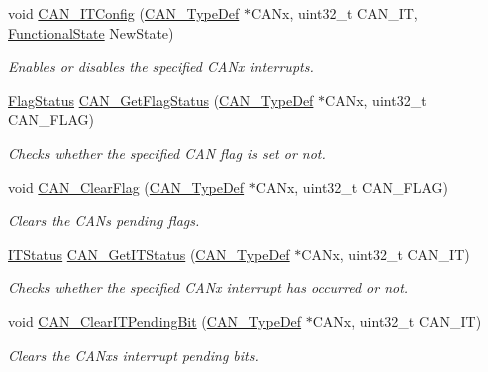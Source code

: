 \begin{DoxyCompactItemize}
void \mbox{\hyperlink{group___c_a_n___private___functions_gad1a8b2499a780b5bfa4accb3597b02f4}{C\+A\+N\+\_\+\+I\+T\+Config}} (\mbox{\hyperlink{struct_c_a_n___type_def}{C\+A\+N\+\_\+\+Type\+Def}} $\ast$C\+A\+Nx, uint32\+\_\+t C\+A\+N\+\_\+\+IT, \mbox{\hyperlink{group___exported__types_gac9a7e9a35d2513ec15c3b537aaa4fba1}{Functional\+State}} New\+State)
\begin{DoxyCompactList}\small\item\em Enables or disables the specified C\+A\+Nx interrupts. \end{DoxyCompactList}\item 
\mbox{\hyperlink{group___exported__types_ga89136caac2e14c55151f527ac02daaff}{Flag\+Status}} \mbox{\hyperlink{group___c_a_n___private___functions_ga2faad96caf823ef463cc5b5b25c480bb}{C\+A\+N\+\_\+\+Get\+Flag\+Status}} (\mbox{\hyperlink{struct_c_a_n___type_def}{C\+A\+N\+\_\+\+Type\+Def}} $\ast$C\+A\+Nx, uint32\+\_\+t C\+A\+N\+\_\+\+F\+L\+AG)
\begin{DoxyCompactList}\small\item\em Checks whether the specified C\+AN flag is set or not. \end{DoxyCompactList}\item 
void \mbox{\hyperlink{group___c_a_n___private___functions_ga2c01646d5d3a2d7045e8dd71f58f8742}{C\+A\+N\+\_\+\+Clear\+Flag}} (\mbox{\hyperlink{struct_c_a_n___type_def}{C\+A\+N\+\_\+\+Type\+Def}} $\ast$C\+A\+Nx, uint32\+\_\+t C\+A\+N\+\_\+\+F\+L\+AG)
\begin{DoxyCompactList}\small\item\em Clears the C\+AN\textquotesingle{}s pending flags. \end{DoxyCompactList}\item 
\mbox{\hyperlink{group___exported__types_gaacbd7ed539db0aacd973a0f6eca34074}{I\+T\+Status}} \mbox{\hyperlink{group___c_a_n___private___functions_ga9aca05b3013e1b3438f3559f80b33c82}{C\+A\+N\+\_\+\+Get\+I\+T\+Status}} (\mbox{\hyperlink{struct_c_a_n___type_def}{C\+A\+N\+\_\+\+Type\+Def}} $\ast$C\+A\+Nx, uint32\+\_\+t C\+A\+N\+\_\+\+IT)
\begin{DoxyCompactList}\small\item\em Checks whether the specified C\+A\+Nx interrupt has occurred or not. \end{DoxyCompactList}\item 
void \mbox{\hyperlink{group___c_a_n___private___functions_ga30bf7ac0c1793f6622a4a1adbb7dbc8a}{C\+A\+N\+\_\+\+Clear\+I\+T\+Pending\+Bit}} (\mbox{\hyperlink{struct_c_a_n___type_def}{C\+A\+N\+\_\+\+Type\+Def}} $\ast$C\+A\+Nx, uint32\+\_\+t C\+A\+N\+\_\+\+IT)
\begin{DoxyCompactList}\small\item\em Clears the C\+A\+Nx\textquotesingle{}s interrupt pending bits. \end{DoxyCompactList}\end{DoxyCompactItemize}


